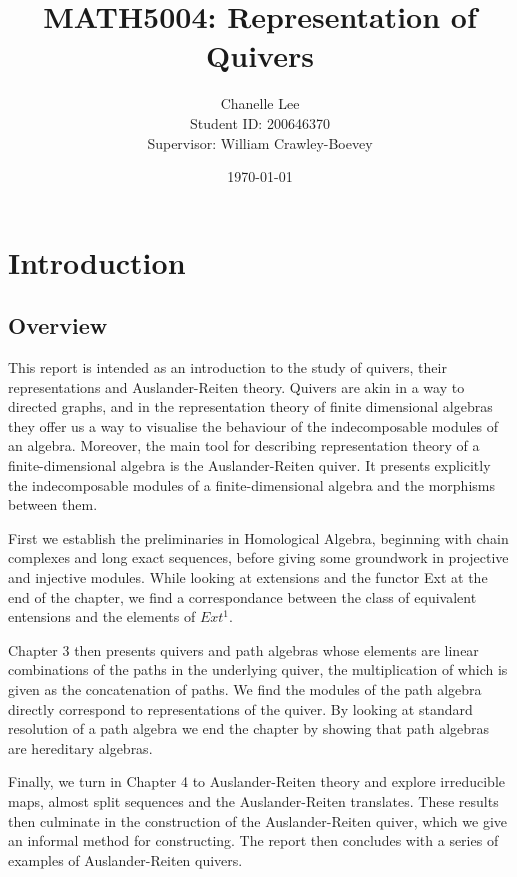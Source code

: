 \documentclass[11.5pt, twoside, a4paper, titlepage]{report}
\theoremstyle{definition}
\theoremstyle{plain}
\begin{document}
\title{MATH5004: Representation of Quivers}
\author{Chanelle Lee \\Student ID: 200646370\\Supervisor: William Crawley-Boevey}
\date{\today}
\maketitle


\tableofcontents

\chapter{Introduction}

\section{Overview}
This report is intended as an introduction to the study of quivers, their representations and Auslander-Reiten theory. Quivers are akin in a way to directed graphs, and in the representation theory of finite dimensional algebras they offer us a way to visualise the behaviour of the indecomposable modules of an algebra. Moreover, the main tool for describing representation theory of a finite-dimensional algebra is the Auslander-Reiten quiver. It presents explicitly the indecomposable modules of a finite-dimensional algebra and the morphisms between them.
\vspace{0.5em}

First we establish the preliminaries in Homological Algebra, beginning with chain complexes and long exact sequences, before giving some groundwork in projective and injective modules. While looking at extensions and the functor Ext at the end of the chapter, we find a correspondance between the class of equivalent entensions and the elements of $Ext^1$.
\vspace{0.5em}

Chapter 3 then presents quivers and path algebras whose elements are linear combinations of the paths in the underlying quiver, the multiplication of which is given as the concatenation of paths. We find the modules of the path algebra directly correspond to representations of the quiver. By looking at standard resolution of a path algebra we end the chapter by showing that path algebras are hereditary algebras.
\vspace{0.5em}

Finally, we turn in Chapter 4 to Auslander-Reiten theory and explore irreducible maps, almost split sequences and the Auslander-Reiten translates. These results then culminate in the construction of the Auslander-Reiten quiver, which we give an informal method for constructing. The report then concludes with a series of examples of Auslander-Reiten quivers.
\vspace{0.5em}
\end{document}

